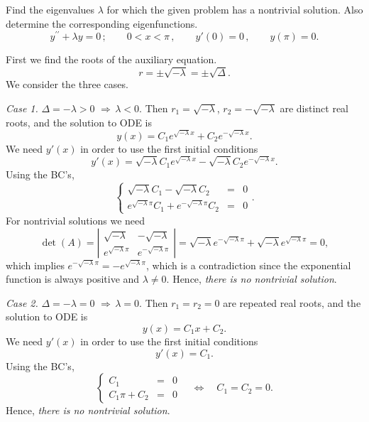 \documentclass[11pt]{article}
\begin{document}
\begin{problem}
 Find the eigenvalues $\lambda$ for which the given problem has a nontrivial solution. Also determine the corresponding eigenfunctions.
\begin{equation*}
y^{\prime \prime} + \lambda y =0\,; \qquad  0<x<\pi \,, \qquad y'(0)=0  \,,\qquad y(\pi) =0. 
\end{equation*}
\end{problem}
\begin{solution}
First we find the roots of the auxiliary equation.
\[r=\pm\sqrt{-\lambda}=\pm\sqrt{\Delta}.\]
We consider the three cases.

\par \textsl{Case 1.} $\Delta = -\lambda >0 \,\, \Rightarrow \, \lambda<0.$ Then $r_{1}=\sqrt{-\lambda}$, $r_{2}=-\sqrt{-\lambda}$ are distinct real roots, and the solution to ODE is
\[y(x)=C_{1}e^{\sqrt{-\lambda}x}+C_{2}e^{-\sqrt{-\lambda}x}.\]
We need $y'(x)$ in order to use the first initial conditions
\[y'(x)=\sqrt{-\lambda}C_{1}e^{\sqrt{-\lambda}x}-\sqrt{-\lambda}C_{2}e^{-\sqrt{-\lambda}x}.\]
Using the BC's,
\begin{equation*}
\left\{\begin{array}{rcl}
        \sqrt{-\lambda}C_{1} - \sqrt{-\lambda}C_{2}&=&0\\
       e^{\sqrt{-\lambda}\pi}C_{1} +e^{-\sqrt{-\lambda}\pi}C_{2}&=&0
      \end{array}\right. .
\end{equation*}
For nontrivial solutions we need 
$$\det(A)=\left|\begin{matrix}\sqrt{-\lambda} & -\sqrt{-\lambda} \\ e^{\sqrt{-\lambda}\pi} & e^{-\sqrt{-\lambda}\pi}\end{matrix}\right|=\sqrt{-\lambda}e^{-\sqrt{-\lambda}\pi}+\sqrt{-\lambda}e^{\sqrt{-\lambda}\pi}=0,$$ 
which implies $e^{-\sqrt{-\lambda}\pi}=-e^{\sqrt{-\lambda}\pi}$, which is a contradiction since the exponential function is always positive and $\lambda\neq 0$. Hence, \textsl{there is no nontrivial solution}.

\par \textsl{Case 2.} $\Delta = -\lambda =0 \,\, \Rightarrow \, \lambda=0.$ Then $r_{1}=r_{2}=0$ are repeated real roots, and the solution to ODE is
\[y(x)=C_{1}x+C_{2}.\]
We need $y'(x)$ in order to use the first initial conditions
\[y'(x)=C_{1}.\]
Using the BC's,
\begin{equation*}
\left\{\begin{array}{rcl}
       C_{1} & = &0\\
       C_{1}\pi+C_{2} & = &0
      \end{array}\right. \quad \Leftrightarrow \quad C_{1}=C_{2}=0.
\end{equation*}
Hence, \textsl{there is no nontrivial solution}.


\end{solution}
\end{document}

